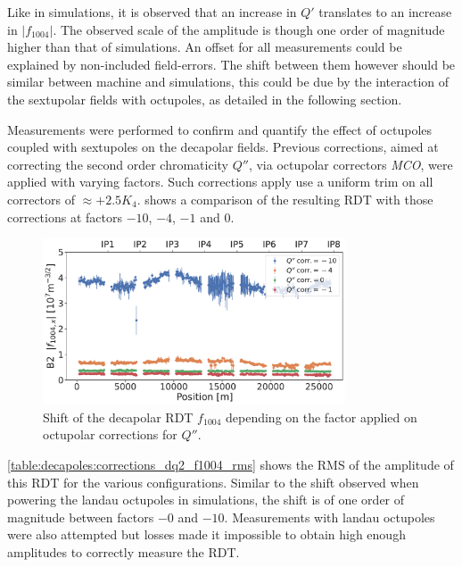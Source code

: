 Like in simulations, it is observed that an increase in $Q'$ translates to an increase in 
$|f_{1004}|$. The observed scale of the amplitude is though one order of magnitude higher than that
of simulations. An offset for all measurements could be explained by non-included field-errors. The
shift between them however should be similar between machine and simulations, this could be due by
the interaction of the sextupolar fields with octupoles, as detailed in the following section. 


Measurements were performed to confirm and quantify the effect of octupoles coupled with sextupoles
on the decapolar fields. Previous corrections, aimed at correcting the second order chromaticity
$Q''$, via octupolar correctors \textit{MCO}, were applied with varying factors. Such corrections
apply use a uniform trim on all correctors of $\approx +2.5K_4$.
 shows a comparison of the resulting RDT with those
corrections at factors $-10$, $-4$, $-1$ and $0$.

\begin{figure}[!htb]
    \centering
    \includegraphics[width=0.8\textwidth]{./images/f1004/f1004x_mco_corr.pdf}
    \caption{Shift of the decapolar RDT $f_{1004}$ depending on the factor applied on octupolar
    corrections for $Q''$.}
    \label{decapoles:rdts:measured_f1004_mco}
\end{figure}

  
\cref{table:decapoles:corrections_dq2_f1004_rms} shows the RMS of the amplitude of this RDT for the 
various configurations. Similar to the shift observed when powering the landau octupoles in
simulations, the shift is of one order of magnitude between factors $-0$ and $-10$. Measurements
with landau octupoles were also attempted but losses made it impossible to obtain high enough
amplitudes to correctly measure the RDT.




